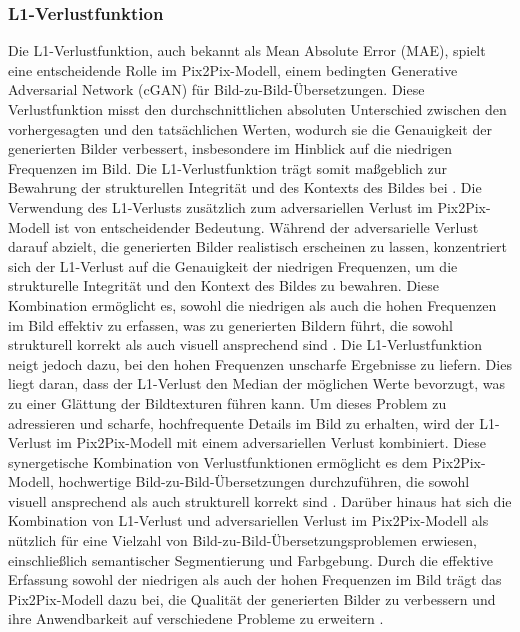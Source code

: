 \subsubsection{L1-Verlustfunktion}

Die L1-Verlustfunktion, auch bekannt als Mean Absolute Error (MAE), spielt eine entscheidende Rolle im Pix2Pix-Modell, einem bedingten Generative Adversarial Network (cGAN) für Bild-zu-Bild-Übersetzungen. Diese Verlustfunktion misst den durchschnittlichen absoluten Unterschied zwischen den vorhergesagten und den tatsächlichen Werten, wodurch sie die Genauigkeit der generierten Bilder verbessert, insbesondere im Hinblick auf die niedrigen Frequenzen im Bild. Die L1-Verlustfunktion trägt somit maßgeblich zur Bewahrung der strukturellen Integrität und des Kontexts des Bildes bei \cite{Isola}. \newline
Die Verwendung des L1-Verlusts zusätzlich zum adversariellen Verlust im Pix2Pix-Modell ist von entscheidender Bedeutung. Während der adversarielle Verlust darauf abzielt, die generierten Bilder realistisch erscheinen zu lassen, konzentriert sich der L1-Verlust auf die Genauigkeit der niedrigen Frequenzen, um die strukturelle Integrität und den Kontext des Bildes zu bewahren. Diese Kombination ermöglicht es, sowohl die niedrigen als auch die hohen Frequenzen im Bild effektiv zu erfassen, was zu generierten Bildern führt, die sowohl strukturell korrekt als auch visuell ansprechend sind \cite{Isola}. \newline
Die L1-Verlustfunktion neigt jedoch dazu, bei den hohen Frequenzen unscharfe Ergebnisse zu liefern. Dies liegt daran, dass der L1-Verlust den Median der möglichen Werte bevorzugt, was zu einer Glättung der Bildtexturen führen kann. Um dieses Problem zu adressieren und scharfe, hochfrequente Details im Bild zu erhalten, wird der L1-Verlust im Pix2Pix-Modell mit einem adversariellen Verlust kombiniert. Diese synergetische Kombination von Verlustfunktionen ermöglicht es dem Pix2Pix-Modell, hochwertige Bild-zu-Bild-Übersetzungen durchzuführen, die sowohl visuell ansprechend als auch strukturell korrekt sind \cite{Isola}. \newline
Darüber hinaus hat sich die Kombination von L1-Verlust und adversariellen Verlust im Pix2Pix-Modell als nützlich für eine Vielzahl von Bild-zu-Bild-Übersetzungsproblemen erwiesen, einschließlich semantischer Segmentierung und Farbgebung. Durch die effektive Erfassung sowohl der niedrigen als auch der hohen Frequenzen im Bild trägt das Pix2Pix-Modell dazu bei, die Qualität der generierten Bilder zu verbessern und ihre Anwendbarkeit auf verschiedene Probleme zu erweitern \cite{Isola}.

